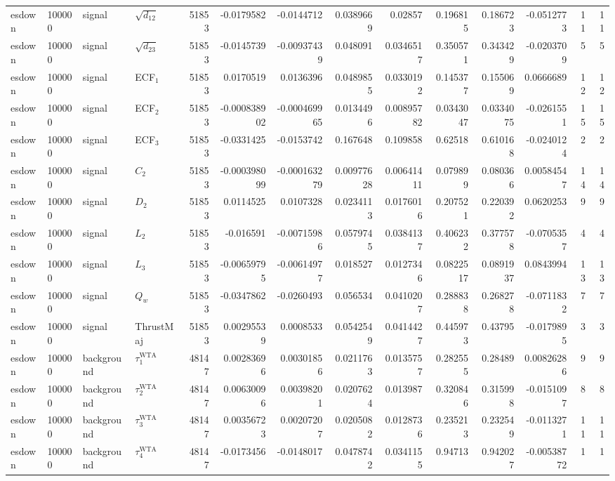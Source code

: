 \begin{landscape}
\begin{longtable}{llll r rrrr rr r rr}
esdown & 100000 & signal & $\sqrt{d_{12}}$ & 51853 & -0.0179582 & -0.0144712 & 0.0389669 & 0.02857 & 0.196815 & 0.186723 & -0.0512773 & 11 & 11 \\
esdown & 100000 & signal & $\sqrt{d_{23}}$ & 51853 & -0.0145739 & -0.00937439 & 0.048091 & 0.0346517 & 0.350571 & 0.343429 & -0.0203709 & 5 & 5 \\
esdown & 100000 & signal & ECF$_1$ & 51853 & 0.0170519 & 0.0136396 & 0.0489855 & 0.0330192 & 0.145377 & 0.155069 & 0.0666689 & 12 & 12 \\
esdown & 100000 & signal & ECF$_2$ & 51853 & -0.000838902 & -0.000469965 & 0.0134496 & 0.00895782 & 0.0343047 & 0.0334075 & -0.0261551 & 15 & 15 \\
esdown & 100000 & signal & ECF$_3$ & 51853 & -0.0331425 & -0.0153742 & 0.167648 & 0.109858 & 0.62518 & 0.610168 & -0.0240124 & 2 & 2 \\
esdown & 100000 & signal & $C_2$ & 51853 & -0.000398099 & -0.000163279 & 0.00977628 & 0.00641411 & 0.079899 & 0.080366 & 0.00584547 & 14 & 14 \\
esdown & 100000 & signal & $D_2$ & 51853 & 0.0114525 & 0.0107328 & 0.0234113 & 0.0176016 & 0.207521 & 0.220392 & 0.0620253 & 9 & 9 \\
esdown & 100000 & signal & $L_2$ & 51853 & -0.016591 & -0.00715986 & 0.0579745 & 0.0384137 & 0.406232 & 0.377578 & -0.0705357 & 4 & 4 \\
esdown & 100000 & signal & $L_3$ & 51853 & -0.00659795 & -0.00614977 & 0.018527 & 0.0127346 & 0.0822517 & 0.0891937 & 0.0843994 & 13 & 13 \\
esdown & 100000 & signal & $Q_w$ & 51853 & -0.0347862 & -0.0260493 & 0.056534 & 0.0410207 & 0.288838 & 0.268278 & -0.0711832 & 7 & 7 \\
esdown & 100000 & signal & ThrustMaj & 51853 & 0.00295539 & 0.0008533 & 0.0542549 & 0.0414427 & 0.445973 & 0.43795 & -0.0179895 & 3 & 3 \\
esdown & 100000 & background & $\tau_1^{\mathrm{WTA}}$ & 48147 & 0.00283696 & 0.00301856 & 0.0211763 & 0.0135757 & 0.282555 & 0.28489 & 0.00826286 & 9 & 9 \\
esdown & 100000 & background & $\tau_2^{\mathrm{WTA}}$ & 48147 & 0.00630096 & 0.00398201 & 0.0207624 & 0.013987 & 0.320846 & 0.315998 & -0.0151097 & 8 & 8 \\
esdown & 100000 & background & $\tau_3^{\mathrm{WTA}}$ & 48147 & 0.00356723 & 0.00207207 & 0.0205082 & 0.0128736 & 0.235213 & 0.232549 & -0.0113271 & 11 & 11 \\
esdown & 100000 & background & $\tau_4^{\mathrm{WTA}}$ & 48147 & -0.0173456 & -0.0148017 & 0.0478742 & 0.0341155 & 0.94713 & 0.942027 & -0.00538772 & 1 & 1 \\

\end{longtable}
\end{landscape}
